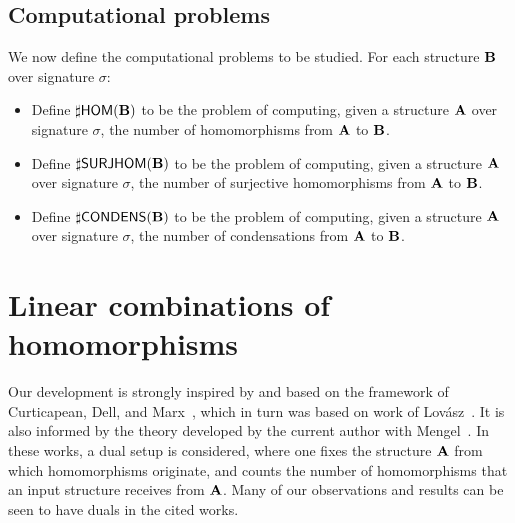 \documentclass[11pt]{article}
\begin{document}
\subsection{Computational problems}

\newcommand{\chom}{\ensuremath{\sharp\mathsf{HOM}}}
\newcommand{\cshom}{\ensuremath{\sharp\mathsf{SURJHOM}}}
\newcommand{\ccondens}{\ensuremath{\sharp\mathsf{CONDENS}}}

\renewcommand{\hom}{\ensuremath{\mathrm{Hom}}}
\newcommand{\shom}{\ensuremath{\mathrm{Surjhom}}}
\newcommand{\condens}{\ensuremath{\mathrm{Condens}}}
\newcommand{\indsub}{\ensuremath{\mathrm{Indsub}}}
\newcommand{\deducts}{\ensuremath{\mathrm{Deducts}}}

We now define the computational problems to be studied.
For each structure $\mathbf{B}$ over signature $\sigma$:

\begin{itemize}

\item 
Define
$\chom(\relb)$ to be the problem of computing,
given a structure $\mathbf{A}$ over signature $\sigma$,
the number of homomorphisms from $\mathbf{A}$ to $\mathbf{B}$.

\item 
Define
$\cshom(\relb)$ to be the problem of computing,
given a structure $\mathbf{A}$ over signature $\sigma$,
the number of surjective homomorphisms from $\mathbf{A}$ to $\mathbf{B}$.

\item 
Define
$\ccondens(\relb)$ to be the problem of computing,
given a structure $\mathbf{A}$ over signature $\sigma$,
the number of condensations from $\mathbf{A}$ to $\mathbf{B}$.

\end{itemize}

\section{Linear combinations of homomorphisms}

Our development is strongly inspired by and based on 
the framework of Curticapean, Dell, and Marx~\cite{CurticapeanDellMarx17-homomorphisms-good-basis},
which in turn was based on work of Lov\'asz~\cite{Lovasz67-operations-structures,Lovasz12-book-networks-and-limits}.
It is also informed by the theory developed by the 
current author with Mengel~\cite{ChenMengel14-pp-arxiv,ChenMengel15-pp-icdt,ChenMengel16-pods-ep-counting,ChenMengel17-lics-logic-counting}.
In these works, a dual setup is considered, where
one fixes the structure $\mathbf{A}$ from which homomorphisms originate,
and counts the number of homomorphisms that an input structure
receives from $\mathbf{A}$.
Many of our observations and results can be seen to have duals
in the cited works.
\end{document}
